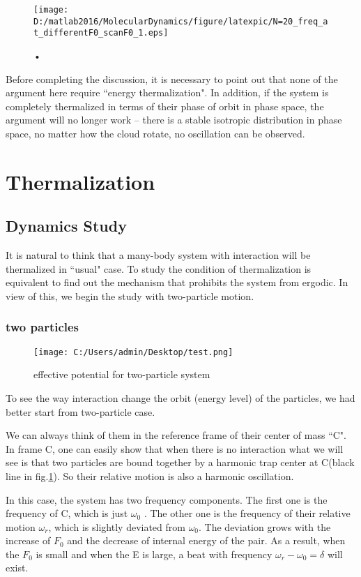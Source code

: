 \documentclass[aps,pre,twocolumn
,groupedaddress]{revtex4-1}
\begin{document}
\begin{figure}[hbtp]
\centering
\texttt{[image: D:/matlab2016/MolecularDynamics/figure/latexpic/N=20\_freq\_at\_differentF0\_scanF0\_1.eps]}
\caption{•}
\end{figure}

 

Before completing the discussion, it is necessary to point out that none of the argument here require ``energy thermalization". In addition, if the system is completely thermalized in terms of their phase of orbit in phase space, the argument will no longer work -- there is a stable isotropic distribution in phase space, no matter how the cloud rotate, no oscillation can be observed.


\section{Thermalization}
\subsection{Dynamics Study}
It is natural to think that a many-body system with interaction will be thermalized in ``usual" case. To study the condition of thermalization is equivalent to find out the mechanism that prohibits the system from ergodic. In view of this, we begin the study with two-particle motion. 
\subsubsection{two particles}

\begin{figure}[hbtp]
\centering
\texttt{[image: C:/Users/admin/Desktop/test.png]}
\caption{effective potential for two-particle system}
\label{fig:thermalization2}
\end{figure}

To see the way interaction change the orbit (energy level) of the particles, we had better start from two-particle case.

We can always think of them in the reference frame of their center of mass ``C". In frame C, one can easily show that when there is no interaction what we will see is that two particles are bound together by a harmonic trap center at C(black line in fig.\ref{fig:thermalization2}). So their relative motion is also a harmonic oscillation. 

In this case, the system has two frequency components. The first one is the frequency of C, which is just $\omega_0$ . The other one is the frequency of their relative motion $\omega_r$, which is slightly deviated from $\omega_0$. The deviation grows with the increase of $F_0$ and the decrease of internal energy of the pair. As a result, when the $F_0$ is small and when the E is large, a beat with frequency $\omega_r-\omega_0=\delta$ will exist. 
\end{document}
